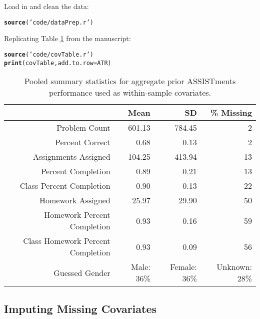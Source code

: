 \documentclass[12pt]{article}\usepackage[]{graphicx}\usepackage[]{xcolor}
\makeatletter
\newcommand{\hlstr}[1]{\textcolor[rgb]{0.192,0.494,0.8}{#1}}%
\newcommand{\hlstd}[1]{\textcolor[rgb]{0.345,0.345,0.345}{#1}}%
\newcommand{\hlkwc}[1]{\textcolor[rgb]{0.333,0.667,0.333}{#1}}%
\newcommand{\hlkwd}[1]{\textcolor[rgb]{0.737,0.353,0.396}{\textbf{#1}}}%
\newenvironment{kframe}{%
 \def\at@end@of@kframe{}%
 \ifinner\ifhmode%
  \def\at@end@of@kframe{\end{minipage}}%
  \begin{minipage}{\columnwidth}%
 \fi\fi%
 \def\FrameCommand##1{\hskip\@totalleftmargin \hskip-\fboxsep
 \colorbox{shadecolor}{##1}\hskip-\fboxsep
     \hskip-\linewidth \hskip-\@totalleftmargin \hskip\columnwidth}%
 \MakeFramed {\advance\hsize-\width
   \@totalleftmargin\z@ \linewidth\hsize
   \@setminipage}}%
 {\par\unskip\endMakeFramed%
 \at@end@of@kframe}
\newenvironment{knitrout}{}{} %
\makeatother
\begin{document}
Load in and clean the data:\\

\begin{knitrout}
\color{fgcolor}\begin{kframe}
\begin{alltt}
\hlkwd{source}\hlstd{(}\hlstr{'code/dataPrep.r'}\hlstd{)}
\end{alltt}
\end{kframe}
\end{knitrout}

Replicating Table \ref{tab:covariates} from the manuscript:

\begin{kframe}
\begin{alltt}
\hlkwd{source}\hlstd{(}\hlstr{'code/covTable.r'}\hlstd{)}
\hlkwd{print}\hlstd{(covTable,} \hlkwc{add.to.row}\hlstd{=ATR)}
\end{alltt}
\end{kframe}%
\begin{table}[ht]
\centering
\begin{tabular}{rrrr}
  \hline
 & Mean & SD & \% Missing \\ 
  \hline
Problem Count & 601.13 & 784.45 & 2 \\ 
  Percent Correct & 0.68 & 0.13 & 2 \\ 
  Assignments Assigned & 104.25 & 413.94 & 13 \\ 
  Percent Completion & 0.89 & 0.21 & 13 \\ 
  Class Percent Completion & 0.90 & 0.13 & 22 \\ 
  Homework Assigned & 25.97 & 29.90 & 50 \\ 
  Homework Percent Completion & 0.93 & 0.16 & 59 \\ 
  Class Homework Percent Completion & 0.93 & 0.09 & 56 \\ 
   Guessed Gender&Male: 36\%&Female: 36\%&Unknown: 28\%\\
 \hline
\end{tabular}
\caption{Pooled summary statistics for aggregate prior ASSISTments performance used as within-sample covariates.} 
\label{tab:covariates}
\end{table}


\subsection{Imputing Missing Covariates}
\end{document}
